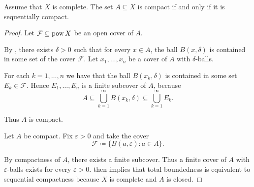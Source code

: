 \begin{theorem}\label{thm:metric_compact_iff_sequentially_compact}
  Assume that \( X \) is complete. The set \( A \subseteq X \) is compact if and only if it is sequentially compact.
\end{theorem}
\begin{proof}
  \SufficiencySubProof Let \( \mathcal{F} \subseteq \operatorname{pow} X \) be an open cover of \( A \).

  By , there exists \( \delta > 0 \) such that for every \( x \in A \), the ball \( B(x, \delta) \) is contained in some set of the cover \( \mathcal{F} \). Let \( x_1, \ldots, x_n \) be a cover of \( A \) with \( \delta \)-balls.

  For each \( k = 1, \ldots, n \) we have that the ball \( B(x_k, \delta) \) is contained in some set \( E_k \in \mathcal{F} \). Hence \( E_1, \ldots, E_n \) is a finite subcover of \( A \), because
  \begin{equation*}
    A \subseteq \bigcup_{k=1}^\infty B(x_k, \delta) \subseteq \bigcup_{k=1}^\infty E_k.
  \end{equation*}

  Thus \( A \) is compact.

  \NecessitySubProof Let \( A \) be compact. Fix \( \varepsilon > 0 \) and take the cover
  \begin{equation*}
    \mathcal{F} \coloneqq \{ B(a, \varepsilon) \colon a \in A \}.
  \end{equation*}

  By compactness of \( A \), there exists a finite subcover. Thus a finite cover of \( A \) with \( \varepsilon \)-balls exists for every \( \varepsilon > 0 \).  then implies that total boundedness is equivalent to sequential compactness because \( X \) is complete and \( A \) is closed.
\end{proof}

